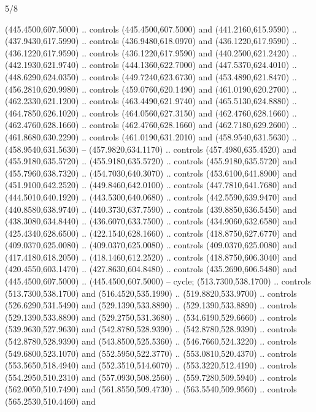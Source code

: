 \begin{flagdescription}{5/8}
\begin{scope}[shift={(m)}]
\begin{scope}[scale=\flagwidth/220,y=0.1mm, x=0.1mm, yscale=-1,shift={(-596,-360)}]
\begin{scope}[draw=black,line join=round,line cap=round,line width=0.381\lw]
\begin{scope}[fill=white,line width=1.143\lw]
 (445.4500,607.5000) .. controls (445.4500,607.5000) and
  (441.2160,615.9590) .. (437.9430,617.5990) .. controls (436.9480,618.0970) and
  (436.1220,617.9590) .. (436.1220,617.9590) .. controls (436.1220,617.9590) and
  (440.2500,621.2420) .. (442.1930,621.9740) .. controls (444.1360,622.7000) and
  (447.5370,624.4010) .. (448.6290,624.0350) .. controls (449.7240,623.6730) and
  (453.4890,621.8470) .. (456.2810,620.9980) .. controls (459.0760,620.1490) and
  (461.0190,620.2700) .. (462.2330,621.1200) .. controls (463.4490,621.9740) and
  (465.5130,624.8880) .. (464.7850,626.1020) .. controls (464.0560,627.3150) and
  (462.4760,628.1660) .. (462.4760,628.1660) .. controls (462.4760,628.1660) and
  (462.7180,629.2600) .. (461.8680,630.2290) .. controls (461.0190,631.2010) and
  (458.9540,631.5630) .. (458.9540,631.5630) -- (457.9820,634.1170) .. controls
  (457.4980,635.4520) and (455.9180,635.5720) .. (455.9180,635.5720) .. controls
  (455.9180,635.5720) and (455.7960,638.7320) .. (454.7030,640.3070) .. controls
  (453.6100,641.8900) and (451.9100,642.2520) .. (449.8460,642.0100) .. controls
  (447.7810,641.7680) and (444.5010,640.1920) .. (443.5300,640.0680) .. controls
  (442.5590,639.9470) and (440.8580,638.9740) .. (440.3730,637.7590) .. controls
  (439.8850,636.5450) and (438.3080,634.8440) .. (436.6070,633.7500) .. controls
  (434.9060,632.6580) and (425.4340,628.6500) .. (422.1540,628.1660) .. controls
  (418.8750,627.6770) and (409.0370,625.0080) .. (409.0370,625.0080) .. controls
  (409.0370,625.0080) and (417.4180,618.2050) .. (418.1460,612.2520) .. controls
  (418.8750,606.3040) and (420.4550,603.1470) .. (427.8630,604.8480) .. controls
  (435.2690,606.5480) and (445.4500,607.5000) .. (445.4500,607.5000) -- cycle;
 (513.7300,538.1700) .. controls (513.7300,538.1700) and
  (516.4520,535.1990) .. (519.8820,533.9700) .. controls (526.6290,531.5490) and
  (529.1390,533.8890) .. (529.1390,533.8890) .. controls (529.1390,533.8890) and
  (529.2750,531.3680) .. (534.6190,529.6660) .. controls (539.9630,527.9630) and
  (542.8780,528.9390) .. (542.8780,528.9390) .. controls (542.8780,528.9390) and
  (543.8500,525.5360) .. (546.7660,524.3220) .. controls (549.6800,523.1070) and
  (552.5950,522.3770) .. (553.0810,520.4370) .. controls (553.5650,518.4940) and
  (552.3510,514.6070) .. (553.3220,512.4190) .. controls (554.2950,510.2310) and
  (557.0930,508.2560) .. (559.7280,509.5940) .. controls (562.0050,510.7490) and
  (561.8550,509.4730) .. (563.5540,509.9560) .. controls (565.2530,510.4460) and

\end{scope}
\end{scope}
\end{scope}
\end{scope}
\end{flagdescription}
